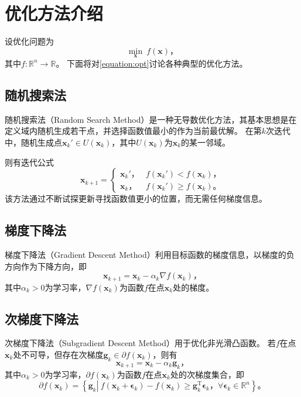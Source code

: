 \section{优化方法介绍}

设优化问题为
\begin{equation}
    \min_{\bm{x}} ~ f(\bm{x}) \text{，}
    \label{equation:opt}
\end{equation}
其中$f:\mathbb{R}^n\to\mathbb{R}$。
下面将对\cref{equation:opt}讨论各种典型的优化方法。

\subsection{随机搜索法}

随机搜索法（Random Search Method）是一种无导数优化方法，其基本思想是在定义域内随机生成若干点，并选择函数值最小的作为当前最优解。
在第$k$次迭代中，随机生成点$\bm{x}_k'\in U(\bm{x}_k)$，其中$U(\bm{x}_k)$为$\bm{x}_k$的某一邻域。

则有迭代公式
\begin{equation*}
    \bm{x}_{k+1}=
    \begin{cases}
        \bm{x}_k' \text{，} &f(\bm{x}_k')<f(\bm{x}_k) \text{，} \\
        \bm{x}_k \text{，} &f(\bm{x}_k')\geq f(\bm{x}_k) \text{。}
    \end{cases}
\end{equation*}
该方法通过不断试探更新寻找函数值更小的位置，而无需任何梯度信息。

\subsection{梯度下降法}

梯度下降法（Gradient Descent Method）利用目标函数的梯度信息，以梯度的负方向作为下降方向，即
\begin{equation*}
    \bm{x}_{k+1}=\bm{x}_k-\alpha_k\nabla f(\bm{x}_k) \text{，}
\end{equation*}
其中$\alpha_k>0$为学习率，$\nabla f(\bm{x}_k)$为函数$f$在点$\bm{x}_k$处的梯度。

\subsection{次梯度下降法}

次梯度下降法（Subgradient Descent Method）用于优化非光滑凸函数。
若$f$在点$\bm{x}_k$处不可导，但存在次梯度$\bm{g}_k\in\partial f(\bm{x}_k)$，则有
\begin{equation*}
    \bm{x}_{k+1}=\bm{x}_k-\alpha_k\bm{g}_k \text{，}
\end{equation*}
其中$\alpha_k>0$为学习率，$\partial f(\bm{x}_k)$为函数$f$在点$\bm{x}_k$处的次梯度集合，即
\begin{equation*}
    \partial f(\bm{x}_k)=\left\{\bm{g}_k \left| ~ f(\bm{x}_k+\bm{\epsilon}_k)-f(\bm{x}_k)\geq\bm{g}_k^\mathrm{T}\bm{\epsilon}_k \text{，} \forall\bm{\epsilon}_k\in\mathbb{R}^n\right.\right\} \text{。}
\end{equation*}

